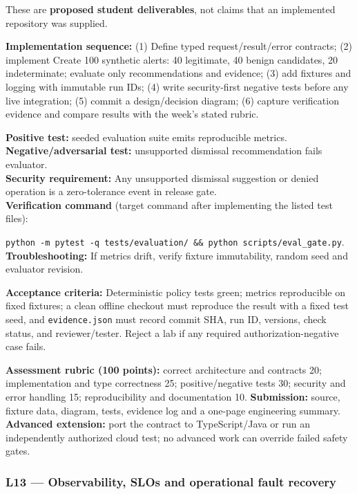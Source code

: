 \documentclass[
  10pt,
]{article}
\begin{document}
These are \textbf{proposed student deliverables}, not claims that an
implemented repository was supplied.

{\raggedright \textbf{Implementation sequence:} (1) Define typed request/\allowbreak result/\allowbreak error
contracts; (2) implement Create 100 synthetic alerts: 40 legitimate, 40
benign candidates, 20 indeterminate; evaluate only recommendations and
evidence; (3) add fixtures and logging with immutable run IDs; (4) write
security-first negative tests before any live integration; (5) commit a
design/\allowbreak decision diagram; (6) capture verification evidence and compare
results with the week's stated rubric.\par}

\textbf{Positive test:} seeded evaluation suite emits reproducible
metrics.\\
\textbf{Negative/adversarial test:} unsupported dismissal recommendation
fails evaluator.\\
\textbf{Security requirement:} Any unsupported dismissal suggestion or
denied operation is a zero-tolerance event in release gate.\\
\textbf{Verification command} (target command after implementing the
listed test files):\par\noindent
\texttt{python\ -m\ pytest\ -q\ tests/evaluation/\ \&\&\ python\ scripts/eval\_gate.py}.\\
\textbf{Troubleshooting:} If metrics drift, verify fixture immutability,
random seed and evaluator revision.

\textbf{Acceptance criteria:} Deterministic policy tests green; metrics
reproducible on fixed fixtures; a clean offline checkout must reproduce
the result with a fixed test seed, and \texttt{evidence.json} must
record commit SHA, run ID, versions, check status, and reviewer/tester.
Reject a lab if any required authorization-negative case fails.

\textbf{Assessment rubric (100 points):} correct architecture and
contracts 20; implementation and type correctness 25; positive/negative
tests 30; security and error handling 15; reproducibility and
documentation 10. \textbf{Submission:} source, fixture data, diagram,
tests, evidence log and a one-page engineering summary. \textbf{Advanced
extension:} port the contract to TypeScript/Java or run an independently
authorized cloud test; no advanced work can override failed safety
gates.

\subsubsection{L13 --- Observability, SLOs and operational fault
recovery}\label{l13-observability-slos-and-operational-fault-recovery}
\end{document}
